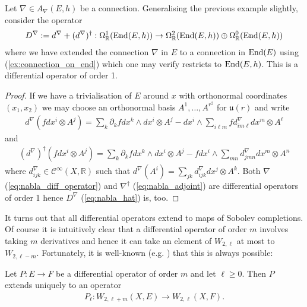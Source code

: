 \documentclass[12pt]{ociamthesis}  %
\begin{document}
\begin{example}
  Let $\nabla\in A_\nabla(E,h)$ be a connection. Generalising the previous
  example slightly, consider the operator
  \begin{align}\label{eq:nabla_hat}
    D^\nabla := d^\nabla + (d^\nabla)^\dagger :
    \Omega^1_{\mathbb R}(\operatorname{End}(E,h)) \to
    \Omega^2_{\mathbb R}(\operatorname{End}(E,h)) \oplus
    \Omega^0_{\mathbb R}(\operatorname{End}(E,h))
  \end{align}
  where we have extended the connection $\nabla$ in $E$ to a connection
  in $\operatorname{End}(E)$ using (\ref{ex:connection_on_end}) which
  one may verify restricts to $\operatorname{End}(E,h)$. This is a
  differential operator of order 1.
  \begin{proof}
    If we have a trivialisation of $E$ around $x$ with orthonormal coordinates
    $(x_1,x_2)$ we may choose an orthonormal basis $A^1,\ldots,A^{r^2}$ for
    $\mathfrak u(r)$ and write
    \begin{align}\label{eq:nabla_diff_operator}
      d^\nabla\left(fdx^i\otimes A^j\right)
      = \sum_k \partial_k f dx^k\wedge dx^i \otimes A^j
      - dx^i\wedge\sum_{i\ell m} fd^\nabla_{im\ell}dx^m\otimes A^\ell
    \end{align}
    and
    \begin{align}\label{eq:nabla_adjoint}
      (d^\nabla)^\dagger\left(fdx^i \otimes A^j\right)
      = \sum_k \partial_k fdx^k\wedge dx^i\otimes A^j
      - fdx^i \wedge \sum_{mn} d^\nabla_{jmn}dx^m\otimes A^n
    \end{align}
    where $d^\nabla_{ijk}\in \mathscr C^\infty(X,\mathbb R)$ such that
    $d^\nabla(A^i) = \sum_{jk}d^\nabla_{ijk}dx^j\otimes A^k$. Both
    $\nabla$ (\ref{eq:nabla_diff_operator}) and $\nabla^\dagger$
    (\ref{eq:nabla_adjoint}) are differential operators of order 1 hence
    $D^\nabla$ (\ref{eq:nabla_hat}) is, too.
  \end{proof}
\end{example}

It turns out that all differential operators extend to maps of Sobolev
completions. Of course it is intuitively clear that a differential
operator of order $m$ involves taking $m$ derivatives and hence
it can take an element of $W_{2,\ell}$ at most to $W_{2,\ell-m}$.
Fortunately, it is well-known (e.g. \cite[Proposition 3.8.4]{bc2009})
that this is always possible:

\begin{theorem}
  Let $P:E\to F$ be a differential operator of order $m$ and
  let $\ell \geq 0$. Then $P$ extends uniquely to an operator
  \begin{align}\label{eq:fredholm_extension}
    P_\ell : W_{2,\ell+m}(X,E) \to W_{2,\ell}(X,F).
  \end{align}
\end{theorem}
\end{document}
